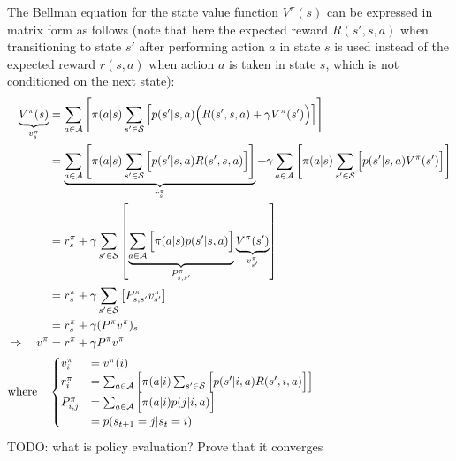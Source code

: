 The Bellman equation for the state value function $V^\pi(s)$ can be expressed in matrix form as follows (note that here the expected reward $R(s',s,a)$ when transitioning to state $s'$ after performing action $a$ in state $s$ is used instead of the expected reward $r(s, a)$ when action $a$ is taken in state $s$, which is not conditioned on the next state):
\begin{align*}
    \underbrace{V^\pi(s)}_{v^\pi_s} &= \sum_{a\in\mathcal{A}}{\left[ \pi(a\vert s) \sum_{s'\in\mathcal{S}}{\left[ p(s'\vert s, a) \Bigl( R(s', s, a) + \gamma V^\pi(s') \Bigr) \right]} \right]} \\
    &= \underbrace{\sum_{a\in\mathcal{A}}{\left[ \pi(a\vert s) \sum_{s'\in\mathcal{S}}{\Bigl[ p(s'\vert s, a) R(s', s, a) \Bigr]} \right]}}_{r^\pi_s} + \gamma\sum_{a\in\mathcal{A}}{\left[ \pi(a\vert s) \sum_{s'\in\mathcal{S}}{\Bigl[ p(s'\vert s, a) V^\pi(s') \Bigr]} \right]} \\
    &= r^\pi_s + \gamma\sum_{s'\in\mathcal{S}}{\left[ \underbrace{\sum_{a\in\mathcal{A}}{\Bigl[ \pi(a\vert s) p(s'\vert s, a) \Bigr]}}_{P^\pi_{s, s'}} \underbrace{V^\pi(s')}_{v^\pi_{s'}} \right]} \\
    &= r^\pi_s + \gamma\sum_{s'\in\mathcal{S}}{\left[ P^\pi_{s, s'} v^\pi_{s'} \right]} \\
    &= r^\pi_s + \gamma  (P^\pi v^\pi)_s \\
    \Rightarrow \quad v^\pi &= r^\pi + \gamma P^\pi v^\pi \\
    \text{where} \quad & \begin{cases}
        v^\pi_i &= v^\pi(i) \\
        r^\pi_i &= \sum_{a\in\mathcal{A}}{\left[ \pi(a\vert i) \sum_{s'\in\mathcal{S}}{\Bigl[ p(s'\vert i, a) R(s', i, a) \Bigr]} \right]} \\
        P^\pi_{i, j} &= \sum_{a\in\mathcal{A}}{\Bigl[ \pi(a\vert i) p(j\vert i, a) \Bigr]} \\
        &= p(s_{t+1}=j\vert s_t=i)
    \end{cases}
\end{align*}
TODO: what is policy evaluation? Prove that it converges
